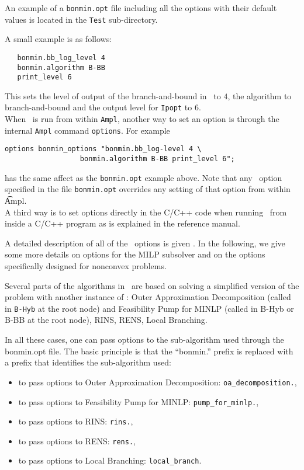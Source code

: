An example of a {\tt bonmin.opt} file including all the options
with their default values is located in the {\tt Test}
sub-directory.

A small example is as follows:
\begin{verbatim}
   bonmin.bb_log_level 4
   bonmin.algorithm B-BB
   print_level 6
\end{verbatim}
This sets the level of output of the branch-and-bound in \Bonmin\ to $4$, the algorithm to branch-and-bound
and the output level for {\tt Ipopt} to $6$.\\

When \Bonmin\ is run from within {\tt Ampl}, another way to set
an option is through the
internal {\tt Ampl} command {\tt options}.
For example
\begin{verbatim}
options bonmin_options "bonmin.bb_log-level 4 \
                  bonmin.algorithm B-BB print_level 6";
\end{verbatim}
has the same affect as the {\tt bonmin.opt} example above.
Note that any \Bonmin\ option specified in the file {\tt bonmin.opt}
overrides any setting of that option from within {\t Ampl}.\\

A third way is to set options directly in the C/C++ code when
running \Bonmin\ from inside a C/C++ program as is explained in the reference manual.

A detailed description of all of the \Bonmin\ options is given .
In the following, we give some more details on options for the MILP subsolver and
on the options specifically designed
for nonconvex problems.\\

\latexhtml{

}{
}

Several parts of the algorithms in \Bonmin\ are based on solving a simplified version of the problem with another instance of \Bonmin:
Outer Approximation Decomposition (called in {\tt B-Hyb} at the root node)
and Feasibility Pump for MINLP (called in B-Hyb or B-BB at the root node), RINS, RENS, Local Branching.

In all these cases, one can pass options to the sub-algorithm used through the bonmin.opt file. The basic principle is
that the ``bonmin.'' prefix  is replaced with a prefix that identifies the sub-algorithm used:
\begin{itemize}
\item to pass options to Outer Approximation Decomposition: {\tt oa\_decomposition.},
\item to pass options to Feasibility Pump for MINLP: {\tt pump\_for\_minlp.},
\item to pass options to RINS: {\tt rins.},
\item to pass options to RENS: {\tt rens.},
\item to pass options to Local Branching: {\tt local\_branch}.
\end{itemize}


